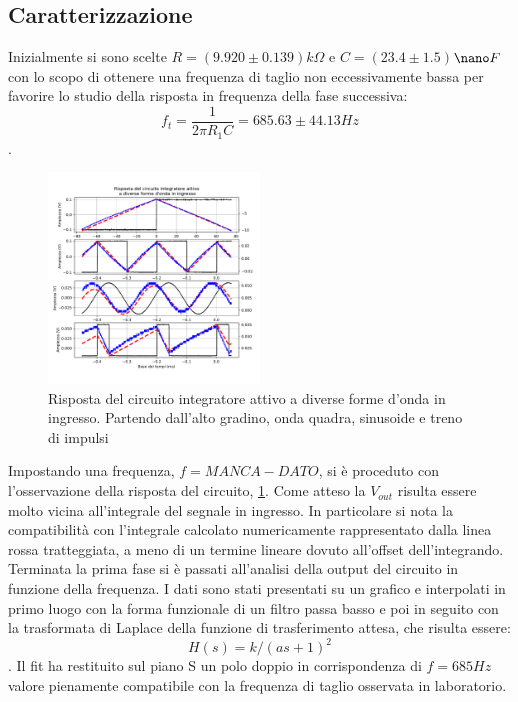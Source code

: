 \documentclass[journal]{IEEEtran}
\begin{document}
\subsection{\textbf{Caratterizzazione}}
Inizialmente si sono scelte $R =$$(9.920 \pm 0.139)$$k\Omega$ e $C=$$(23.4 \pm 1.5)$$\nano F$ con lo scopo di ottenere una frequenza di taglio non eccessivamente bassa per favorire lo studio della risposta in frequenza della fase successiva: \[f_{t} = \frac{1}{2 \pi R_{1} C}= 685.63 \pm 44.13 Hz\].

\begin{figure}[H]%
\begin {center}
\includegraphics[width=0.50\textwidth]{analysis/output/OPA-integ-with-res.pdf}
\caption{Risposta del circuito integratore attivo a diverse forme d'onda in ingresso. Partendo dall'alto gradino, onda quadra, sinusoide e treno di impulsi}
\label{fig:OPA-integ-res}
\end {center}
\end{figure}
Impostando una frequenza, $f= MANCA-DATO$, si è proceduto con l'osservazione della risposta del circuito, \ref{fig:OPA-integ-res}. Come atteso la $V_{out}$ risulta essere molto vicina all'integrale del segnale in ingresso. In particolare si nota la compatibilità con l'integrale calcolato numericamente rappresentato dalla linea rossa tratteggiata, a meno di un termine lineare dovuto all'offset dell'integrando.
Terminata la prima fase si è passati all'analisi della output del circuito in funzione della frequenza. I dati sono stati presentati su un grafico e interpolati in primo luogo con la forma funzionale di un filtro passa basso e poi in seguito con la trasformata di Laplace della funzione di trasferimento attesa, che risulta essere: \[H(s)=k/(as+1)^2\]. Il fit ha restituito sul piano S un polo doppio in corrispondenza di $f=685 Hz$ valore pienamente compatibile con la frequenza di taglio osservata in laboratorio.
\end{document}
